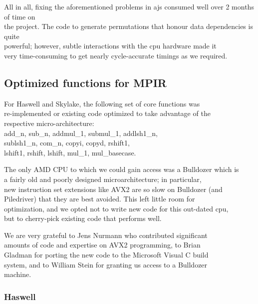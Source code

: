 All in all, fixing the aforementioned problems in ajs consumed well over
2 months of time on\\
the project. The code to generate permutations that honour data
dependencies is quite\\
powerful; however, subtle interactions with the cpu hardware made it\\
very time-consuming to get nearly cycle-accurate timings as we required.

\subsection{Optimized functions for
MPIR}\label{optimized-functions-for-mpir}

For Haswell and Skylake, the following set of core functions was\\
re-implemented or existing code optimized to take advantage of the\\
respective micro-architecture:\\
add\_n, sub\_n, addmul\_1, submul\_1, addlsh1\_n,\\
sublsh1\_n, com\_n, copyi, copyd, rshift1,\\
lshift1, rshift, lshift, mul\_1, mul\_basecase.

The only AMD CPU to which we could gain access was a Bulldozer which
is\\
a fairly old and poorly designed microarchitecture; in particular,\\
new instruction set extensions like AVX2 are so slow on Bulldozer (and\\
Piledriver) that they are best avoided. This left little room for\\
optimization, and we opted not to write new code for this out-dated
cpu,\\
but to cherry-pick existing code that performs well.

We are very grateful to Jens Nurmann who contributed significant\\
amounts of code and expertise on AVX2 programming, to Brian\\
Gladman for porting the new code to the Microsoft Visual C build\\
system, and to William Stein for granting us access to a Bulldozer\\
machine.

\subsubsection{Haswell}\label{haswell}


